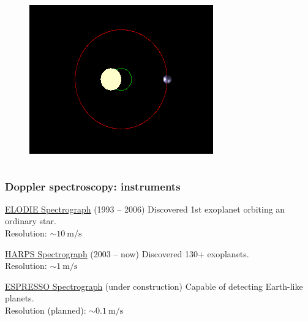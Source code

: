 \documentclass[aspectratio=169]{beamer}
\begin{document}
\begin{frame}
\begin{columns}
\begin{figure}
\includegraphics[width=\textwidth]{img/Dopplerspectr-above.png}
\end{figure}

\end{columns}
\end{frame}

\begin{frame}
\frametitle{Doppler spectroscopy: instruments}
\begin{block}{\href{http://www.obs-hp.fr/guide/elodie/elodie-eng.html}{ELODIE Spectrograph} (1993 -- 2006)}
Discovered 1st exoplanet orbiting an ordinary star. \\
Resolution: $\sim 10 \: \mathrm{m/s}$
\end{block}
\begin{block}{\href{https://www.eso.org/sci/facilities/lasilla/instruments/harps.html}{%
HARPS Spectrograph} (2003 -- now)}
Discovered 130+ exoplanets. \\
Resolution: $\sim 1 \: \mathrm{m/s}$
\end{block}
\begin{block}{\href{https://www.eso.org/sci/facilities/paranal/instruments/espresso.html}{%
ESPRESSO Spectrograph} (under construction)}
Capable of detecting Earth-like planets. \\
Resolution (planned): $\sim 0.1 \: \mathrm{m/s}$
\end{block}
\end{frame}
\end{document}
